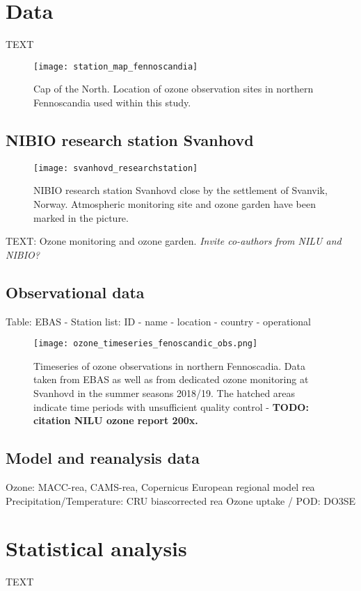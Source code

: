 \documentclass[bg, manuscript]{copernicus}
\begin{document}
\section{Data}
TEXT
\begin{figure}[t]
  \texttt{[image: station\_map\_fennoscandia]}
  \caption{Cap of the North. Location of ozone observation sites in northern Fennoscandia used within this study.}
  \label{fig:station_map_fennoscandia}
\end{figure}


\subsection{NIBIO research station Svanhovd}

\begin{figure}[t]
  \texttt{[image: svanhovd\_researchstation]}
  \caption{NIBIO research station Svanhovd close by the settlement of Svanvik, Norway. Atmospheric monitoring site and ozone garden have been marked in the picture.}
  \label{fig:svanhovd_research_station}
\end{figure}
TEXT: Ozone monitoring and ozone garden. \emph{Invite co-authors from NILU and NIBIO?}


\subsection{Observational data}
Table: EBAS - Station list: ID - name - location - country - operational
\begin{figure*}[t]
  \texttt{[image: ozone\_timeseries\_fenoscandic\_obs.png]}
  \label{fig:ozone_timesseries_fenoscandic_obs}
  \caption{Timeseries of ozone observations in northern Fennoscadia. Data taken from EBAS as well as from dedicated ozone monitoring at Svanhovd in the summer seasons 2018/19. The hatched areas indicate time periods with unsufficient quality control - \bf{TODO: citation NILU ozone report 200x}.}
\end{figure*}



\subsection{Model and reanalysis data}
Ozone: MACC-rea, CAMS-rea, Copernicus European regional model rea
Precipitation/Temperature: CRU biascorrected rea
Ozone uptake / POD: DO3SE



\section{Statistical analysis}
TEXT
\end{document}

